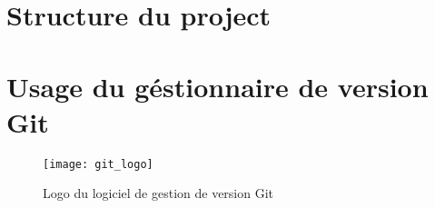 \appendix
\chapter{Structure du project}
\chapter{Usage du géstionnaire de version Git}

\begin{figure}
\center
\texttt{[image: git\_logo]}
\caption{Logo du logiciel de gestion de version Git}
\label{fig:git}
\end{figure}
